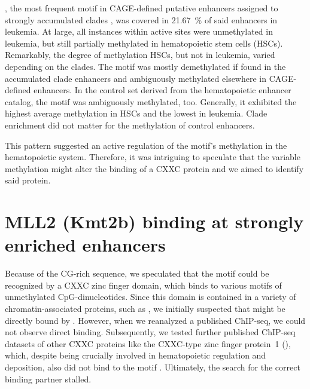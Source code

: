 \motifmlltwo, the most frequent motif in CAGE-defined putative enhancers assigned to strongly accumulated clades , was covered in \SI{21.67}{\percent} of said enhancers in leukemia. At large, all instances within active sites were unmethylated in \mllafnine leukemia, but still partially methylated in hematopoietic stem cells (HSCs). Remarkably, the degree of methylation HSCs, but not in leukemia, varied depending on the clades. The motif was mostly demethylated if found in the accumulated clade enhancers and ambiguously methylated elsewhere in CAGE-defined enhancers. In the control set derived from the hematopoietic enhancer catalog, the motif was ambiguously methylated, too. Generally, it exhibited the highest average methylation in HSCs and the lowest in \dnmtchip leukemia. Clade enrichment did not matter for the methylation of control enhancers.

This pattern suggested an active regulation of the motif's methylation in the hematopoietic system. Therefore, it was intriguing to speculate that the variable methylation might alter the binding of a CXXC protein and we aimed to identify said protein. 

\section{MLL2 (Kmt2b) binding at strongly enriched enhancers}
\label{chap:r:enhancers:motifs:mlltwo}

Because of the CG-rich sequence, we speculated that the motif \motifmlltwo could be recognized by a CXXC zinc finger domain, which binds to various motifs of unmethylated CpG-dinucleotides\cite{Xu2018a}. Since this domain is contained in a variety of chromatin-associated proteins, such as \cite{Allen2006}, we initially suspected that \motifmlltwo might be directly bound by \mllafnine. However, when we reanalyzed a published \mllafnine ChIP-seq\cite{Bernt2011}, we could not observe direct binding\dns. Subsequently, we tested further published ChIP-seq datasets of other CXXC proteins like the CXXC-type zinc finger protein~1 (), which, despite being crucially involved in hematopoietic regulation\cite{Chun2014} and \hisfourthree deposition\cite{Cao2016}, also did not bind to the motif \dns. Ultimately, the search for the correct binding partner stalled.

